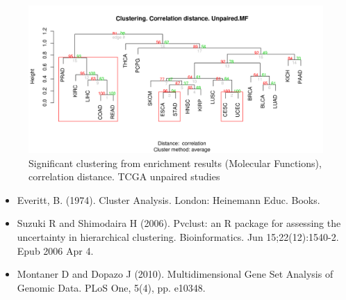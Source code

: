 \documentclass[a4paper,12pt]{article}
\begin{document}
\begin{figure}[!h] 
\centering 
\includegraphics[width=1\textwidth]{img/sigcluster_corelationd_mf_unpaired.png} 
\caption{Significant clustering from enrichment results (Molecular Functions), correlation distance.  TCGA unpaired studies} 
\label{figCLUSTsig_corr_mf_unpaired} 
\end{figure} 
\clearpage












\begin{itemize}
 \item Everitt, B. (1974). Cluster Analysis. London: Heinemann Educ. Books.
 \item Suzuki R and Shimodaira H (2006).  Pvclust: an R package for assessing the uncertainty in hierarchical clustering. Bioinformatics. Jun 15;22(12):1540-2. Epub 2006 Apr 4.
 \item Montaner D and Dopazo J (2010). Multidimensional Gene Set Analysis of Genomic Data. PLoS One, 5(4), pp. e10348. 
\end{itemize}
\end{document}
